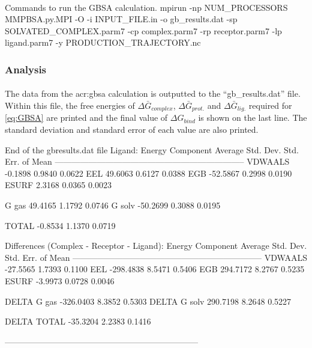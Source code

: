     \paragraph{}

    \begin{bashcmd}[label=listing:gbsa-run]{Commands to run the GBSA calculation.}
    mpirun -np NUM_PROCESSORS MMPBSA.py.MPI -O -i INPUT_FILE.in -o gb_results.dat -sp SOLVATED_COMPLEX.parm7 -cp complex.parm7 -rp receptor.parm7 -lp ligand.parm7 -y PRODUCTION_TRAJECTORY.nc
    \end{bashcmd}

    \subsubsection{Analysis}
    \paragraph{}
        The data from the \gls{acr:gbsa} calculation is outputted to the \enquote{gb\_results.dat} file. Within this file, the free energies of $\Delta \bar{G}_{complex}$, $\Delta \bar{G}_{prot.}$ and $\Delta \bar{G}_{lig.}$  required for \cref{eq:GBSA} are printed and the final value of $\Delta G_{bind}$ is shown on the last line. The standard deviation and standard error of each value are also printed. 

    \begin{bashoutput}[label=out:gbresults]{End of the gb\textunderscore results.dat file}
Ligand:
Energy Component       Average        Std. Dev.   Std. Err. of Mean
--------------------------------------------------------------------
VDWAALS                -0.1898           0.9840              0.0622
EEL                    49.6063           0.6127              0.0388
EGB                   -52.5867           0.2998              0.0190
ESURF                   2.3168           0.0365              0.0023

G gas                  49.4165           1.1792              0.0746
G solv                -50.2699           0.3088              0.0195

TOTAL                  -0.8534           1.1370              0.0719

Differences (Complex - Receptor - Ligand):
Energy Component       Average        Std. Dev.   Std. Err. of Mean
--------------------------------------------------------------------
VDWAALS               -27.5565           1.7393              0.1100
EEL                  -298.4838           8.5471              0.5406
EGB                   294.7172           8.2767              0.5235
ESURF                  -3.9973           0.0728              0.0046

DELTA G gas          -326.0403           8.3852              0.5303
DELTA G solv          290.7198           8.2648              0.5227

DELTA TOTAL           -35.3204           2.2383              0.1416

---------------------------------------------------------------------
    \end{bashoutput}